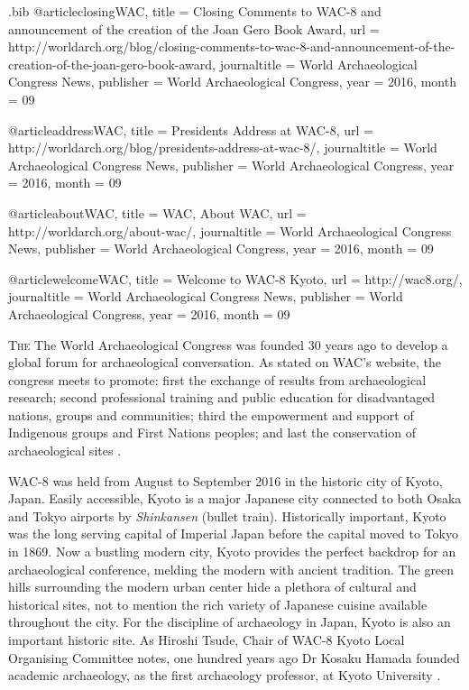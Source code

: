 \begin{filecontents}{\IJSRAidentifier.bib}
@article{closingWAC,
	title = {Closing Comments to WAC-8 and announcement of the creation of the Joan Gero Book Award},
	url = {http://worldarch.org/blog/closing-comments-to-wac-8-and-announcement-of-the-creation-of-the-joan-gero-book-award},
	journaltitle = {World Archaeological Congress News},
	publisher = {World Archaeological Congress},
	year = {2016},
	month = {09}
}

@article{addressWAC,
	title = {Presidents Address at WAC-8},
	url = {http://worldarch.org/blog/presidents-address-at-wac-8/},
	journaltitle = {World Archaeological Congress News},
	publisher = {World Archaeological Congress},
	year = {2016},
	month = {09}
}

@article{aboutWAC,
	title = {WAC, About WAC},
	url = {http://worldarch.org/about-wac/},
	journaltitle = {World Archaeological Congress News},
	publisher = {World Archaeological Congress},
	year = {2016},
	month = {09}
}

@article{welcomeWAC,
	title = {Welcome to WAC-8 Kyoto},
	url = {http://wac8.org/},
	journaltitle = {World Archaeological Congress News},
	publisher = {World Archaeological Congress},
	year = {2016},
	month = {09}
}
\end{filecontents}

%
\IJSRAopening
\lettrine{T}{he} The World Archaeological Congress was founded 30 years ago to develop a global forum for archaeological conversation. As stated on WAC’s website, the congress meets to promote:
first the exchange of results from archaeological research;
second professional training and public education for disadvantaged nations, groups and communities;
third the empowerment and support of Indigenous groups and First Nations peoples;
and last the conservation of archaeological sites \parencite{aboutWAC}.

WAC-8 was held from August  to September  2016 in the historic city of Kyoto, Japan. Easily accessible, Kyoto is a major Japanese city connected to both Osaka and Tokyo airports by \textit{Shinkansen} (bullet train). Historically important, Kyoto was the long serving capital of Imperial Japan before the capital moved to Tokyo in 1869. Now a bustling modern city, Kyoto provides the perfect backdrop for an archaeological conference, melding the modern with ancient tradition. The green hills surrounding the modern urban center hide a plethora of cultural and historical sites, not to mention the rich variety of Japanese cuisine available throughout the city. For the discipline of archaeology in Japan, Kyoto is also an important historic site. As Hiroshi Tsude, Chair of WAC-8 Kyoto Local Organising Committee notes, one hundred years ago Dr Kosaku Hamada founded academic archaeology, as the first archaeology professor, at Kyoto University \parencite{welcomeWAC}. 


